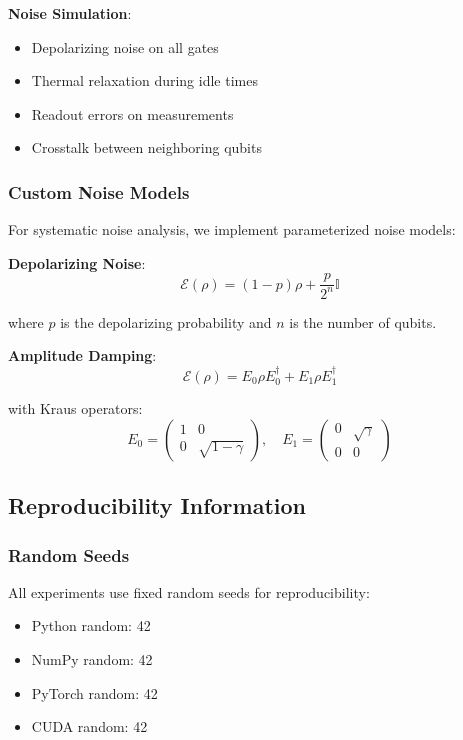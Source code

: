 \textbf{Noise Simulation}:
\begin{itemize}
    \item Depolarizing noise on all gates
    \item Thermal relaxation during idle times
    \item Readout errors on measurements
    \item Crosstalk between neighboring qubits
\end{itemize}

\subsubsection{Custom Noise Models}

For systematic noise analysis, we implement parameterized noise models:

\textbf{Depolarizing Noise}:
$$\mathcal{E}(\rho) = (1-p)\rho + \frac{p}{2^n}\mathbb{I}$$

where $p$ is the depolarizing probability and $n$ is the number of qubits.

\textbf{Amplitude Damping}:
$$\mathcal{E}(\rho) = E_0\rho E_0^\dagger + E_1\rho E_1^\dagger$$

with Kraus operators:
$$E_0 = \begin{pmatrix} 1 & 0 \\ 0 & \sqrt{1-\gamma} \end{pmatrix}, \quad E_1 = \begin{pmatrix} 0 & \sqrt{\gamma} \\ 0 & 0 \end{pmatrix}$$

\subsection{Reproducibility Information}

\subsubsection{Random Seeds}

All experiments use fixed random seeds for reproducibility:
\begin{itemize}
    \item Python random: 42
    \item NumPy random: 42
    \item PyTorch random: 42
    \item CUDA random: 42
\end{itemize}

